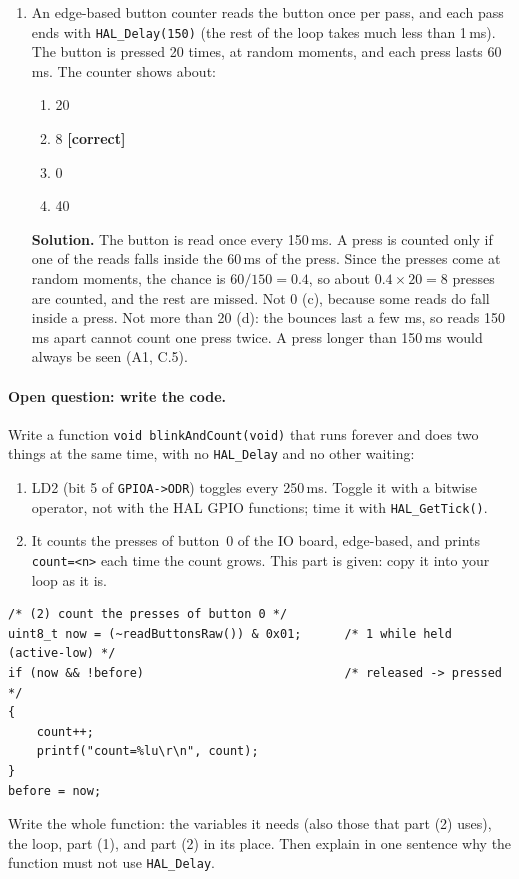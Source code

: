 \documentclass[11pt,a4paper]{article}
\newcommand{\correct}{\quad\textcolor{green!50!black}{\textbf{[correct]}}}
\newenvironment{solution}{\par\noindent\ignorespaces}{\par}
\newcommand{\answerspace}[1]{}
\begin{document}
\begin{enumerate}[label=\textbf{Q\arabic*.}, leftmargin=2.5em, itemsep=6pt]
  \item An edge-based button counter reads the button once per pass, and each pass ends with
  \texttt{HAL\_Delay(150)} (the rest of the loop takes much less than 1\,ms). The button is pressed 20 times, at random
  moments, and each press lasts 60\,ms. The counter shows about:
  \begin{enumerate}[label=(\alph*)]
    \item 20
    \item 8 \correct
    \item 0
    \item 40
  \end{enumerate}
  \begin{solution}
  \textbf{Solution.} The button is read once every 150\,ms. A press is counted only if one of the reads falls inside
  the 60\,ms of the press. Since the presses come at random moments, the chance is $60 / 150 = 0.4$, so about
  $0.4 \times 20 = 8$ presses are counted, and the rest are missed. Not 0 (c), because some reads do fall inside a
  press. Not more than 20 (d): the bounces last a few ms, so reads 150\,ms apart cannot count one press twice. A press longer
  than 150\,ms would always be seen (A1, C.5).
  \end{solution}
\end{enumerate}

\paragraph{Open question: write the code.}
Write a function \texttt{void blinkAndCount(void)} that runs forever and does two things at the same time, with no
\texttt{HAL\_Delay} and no other waiting:
\begin{enumerate}[label=(\arabic*)]
  \item LD2 (bit 5 of \texttt{GPIOA->ODR}) toggles every 250\,ms. Toggle it with a bitwise operator, not with the HAL
        GPIO functions; time it with \texttt{HAL\_GetTick()}.
  \item It counts the presses of button~0 of the IO board, edge-based, and prints \texttt{count=<n>} each time the
        count grows. This part is given: copy it into your loop as it is.
\end{enumerate}
\begin{lstlisting}
/* (2) count the presses of button 0 */
uint8_t now = (~readButtonsRaw()) & 0x01;      /* 1 while held (active-low) */
if (now && !before)                            /* released -> pressed */
{
    count++;
    printf("count=%lu\r\n", count);
}
before = now;
\end{lstlisting}
Write the whole function: the variables it needs (also those that part (2) uses), the loop, part (1), and part (2) in
its place. Then explain in one sentence why the function must not use \texttt{HAL\_Delay}.
\answerspace{12cm}
\end{document}
